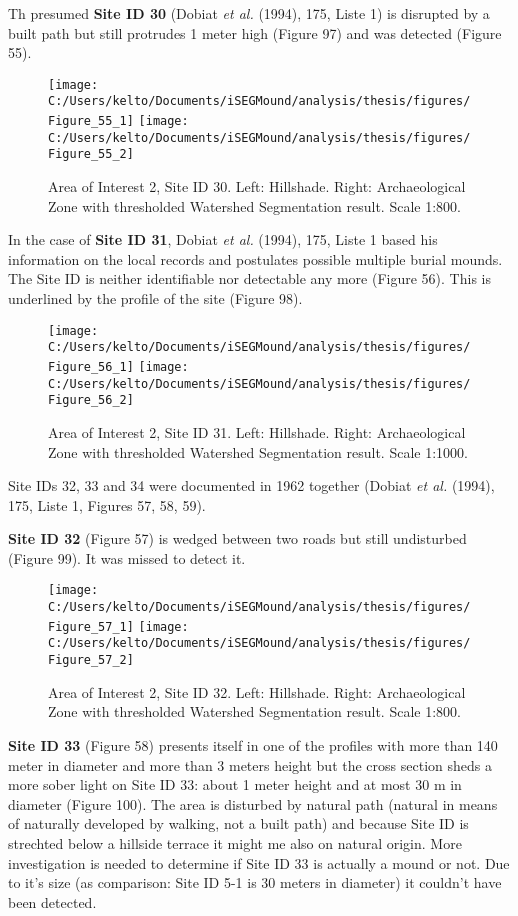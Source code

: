 \documentclass[
  12pt,
]{article}
\begin{document}
Th presumed \textbf{Site ID 30} (Dobiat \emph{et al.} (1994), 175, Liste 1) is disrupted by a built path but still protrudes 1 meter high (Figure 97) and was detected (Figure 55).

\begin{figure}
\texttt{[image: C:/Users/kelto/Documents/iSEGMound/analysis/thesis/figures/Figure\_55\_1]} \texttt{[image: C:/Users/kelto/Documents/iSEGMound/analysis/thesis/figures/Figure\_55\_2]} \caption{Area of Interest 2, Site ID 30. Left: Hillshade. Right: Archaeological Zone with thresholded Watershed Segmentation result. Scale 1:800.}\label{fig:Figure55}
\end{figure}

In the case of \textbf{Site ID 31}, Dobiat \emph{et al.} (1994), 175, Liste 1 based his information on the local records and postulates possible multiple burial mounds. The Site ID is neither identifiable nor detectable any more (Figure 56). This is underlined by the profile of the site (Figure 98).

\begin{figure}
\texttt{[image: C:/Users/kelto/Documents/iSEGMound/analysis/thesis/figures/Figure\_56\_1]} \texttt{[image: C:/Users/kelto/Documents/iSEGMound/analysis/thesis/figures/Figure\_56\_2]} \caption{Area of Interest 2, Site ID 31. Left: Hillshade. Right: Archaeological Zone with thresholded Watershed Segmentation result. Scale 1:1000.}\label{fig:Figure56}
\end{figure}

Site IDs 32, 33 and 34 were documented in 1962 together (Dobiat \emph{et al.} (1994), 175, Liste 1, Figures 57, 58, 59).

\textbf{Site ID 32} (Figure 57) is wedged between two roads but still undisturbed (Figure 99). It was missed to detect it.

\begin{figure}
\texttt{[image: C:/Users/kelto/Documents/iSEGMound/analysis/thesis/figures/Figure\_57\_1]} \texttt{[image: C:/Users/kelto/Documents/iSEGMound/analysis/thesis/figures/Figure\_57\_2]} \caption{Area of Interest 2, Site ID 32. Left: Hillshade. Right: Archaeological Zone with thresholded Watershed Segmentation result. Scale 1:800.}\label{fig:Figure57}
\end{figure}

\textbf{Site ID 33} (Figure 58) presents itself in one of the profiles with more than 140 meter in diameter and more than 3 meters height but the cross section sheds a more sober light on Site ID 33: about 1 meter height and at most 30 m in diameter (Figure 100). The area is disturbed by natural path (natural in means of naturally developed by walking, not a built path) and because Site ID is strechted below a hillside terrace it might me also on natural origin. More investigation is needed to determine if Site ID 33 is actually a mound or not. Due to it's size (as comparison: Site ID 5-1 is 30 meters in diameter) it couldn't have been detected.
\end{document}
